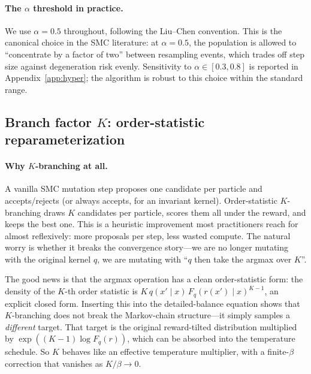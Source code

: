 \paragraph{The $\alpha$ threshold in practice.}
We use $\alpha\!=\!0.5$ throughout, following the Liu–Chen \citep{liuchen1995} convention. This is the canonical choice in the SMC literature: at $\alpha\!=\!0.5$, the population is allowed to ``concentrate by a factor of two'' between resampling events, which trades off step size against degeneration risk evenly. Sensitivity to $\alpha\!\in\![0.3,0.8]$ is reported in Appendix~\ref{app:hyper}; the algorithm is robust to this choice within the standard range.

\subsection{Branch factor $K$: order-statistic reparameterization}\label{app:K}

\paragraph{Why $K$-branching at all.}
A vanilla SMC mutation step proposes one candidate per particle and accepts/rejects (or always accepts, for an invariant kernel). Order-statistic $K$-branching draws $K$ candidates per particle, scores them all under the reward, and keeps the best one. This is a heuristic improvement most practitioners reach for almost reflexively: more proposals per step, less wasted compute. The natural worry is whether it breaks the convergence story—we are no longer mutating with the original kernel $q$, we are mutating with ``$q$ then take the argmax over $K$''.

The good news is that the argmax operation has a clean order-statistic form: the density of the $K$-th order statistic is $K\,q(x'\mid x)\,F_q(r(x')\mid x)^{K-1}$, an explicit closed form. Inserting this into the detailed-balance equation shows that $K$-branching does not break the Markov-chain structure—it simply samples a \emph{different} target. That target is the original reward-tilted distribution multiplied by $\exp((K\!-\!1)\log F_q(r))$, which can be absorbed into the temperature schedule. So $K$ behaves like an effective temperature multiplier, with a finite-$\beta$ correction that vanishes as $K/\beta\!\to\!0$.

